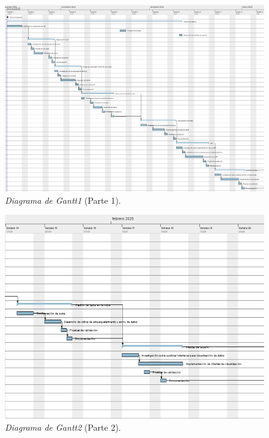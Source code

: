 \documentclass[
11pt, %
codirector, %
]{charter}
\begin{document}
\begin{landscape}
\begin{figure}[htpb]
\centering 
\includegraphics[width=1.55\textwidth, height=1\textheight]{./Figuras/Gantt.png}
\caption{\textit{Diagrama de Gantt1} (Parte 1).} %
\label{fig:diagGantt}
\end{figure}
\end{landscape}

\begin{landscape}
\begin{figure}[htpb]
\centering 
\includegraphics[width=1.55\textwidth, height=1\textheight]{./Figuras/Gantt (1).png}
\caption{\textit{Diagrama de Gantt2} (Parte 2).} %
\label{fig:diagGantt}
\end{figure}
\end{landscape}
\end{document}
